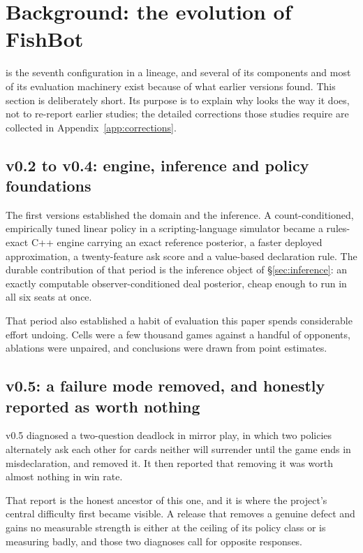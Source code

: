 \section{Background: the evolution of FishBot}
\label{sec:background}

\sestina{} is the seventh configuration in a lineage, and several of its components and most of its
evaluation machinery exist because of what earlier versions found. This section is deliberately
short. Its purpose is to explain why \sestina{} looks the way it does, not to re-report earlier
studies; the detailed corrections those studies require are collected in Appendix~\ref{app:corrections}.

\subsection{v0.2 to v0.4: engine, inference and policy foundations}
\label{sec:background-early}

The first versions established the domain and the inference. A count-conditioned, empirically tuned
linear policy in a scripting-language simulator became a rules-exact C++ engine carrying an exact
reference posterior, a faster deployed approximation, a twenty-feature ask score and a value-based
declaration rule. The durable contribution of that period is the inference object of
\S\ref{sec:inference}: an exactly computable observer-conditioned deal posterior, cheap enough to run
in all six seats at once.

That period also established a habit of evaluation this paper spends considerable effort undoing.
Cells were a few thousand games against a handful of opponents, ablations were unpaired, and
conclusions were drawn from point estimates.

\subsection{v0.5: a failure mode removed, and honestly reported as worth nothing}
\label{sec:background-vfive}

v0.5 diagnosed a two-question deadlock in mirror play, in which two policies alternately ask each
other for cards neither will surrender until the game ends in misdeclaration, and removed it. It then
reported that removing it was worth almost nothing in win rate.

That report is the honest ancestor of this one, and it is where the project's central difficulty
first became visible. A release that removes a genuine defect and gains no measurable strength is
either at the ceiling of its policy class or is measuring badly, and those two diagnoses call for
opposite responses.

